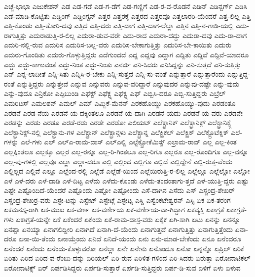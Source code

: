 {ಎಚ್ಜೆ-ಭಾಭಾ
ಎಜುಕೇಶನ್
ಎಡ
ಎಡ-ಗಡೆ
ಎಡ-ಗ-ಡೆಗೆ
ಎಡ-ಗಣ್ಣಿಗೆ
ಎಡ-ರ-ವ-ರೊಡನೆ
ಎಡಿನ್
ಎಡಿನ್ಬರ್ಗ್
ಎಡಿಸಿ
ಎಡೆ-ಮಾಡಿ-ಕೊಟ್ಟಿತು
ಎಡ್ಡಿಂಗ್
ಎಡ್ಡಿಂಗ್ಟನ್
ಎತ್ತರ
ಎತ್ತರಕ್ಕೆ
ಎತ್ತರದ
ಎತ್ತರವೂ
ಎತ್ತಲಾರರಿ-ಯೆಂದರೆ
ಎತ್ತ-ಲಿಲ್ಲ
ಎತ್ತಿ
ಎತ್ತಿ-ಕೊಂಡು
ಎತ್ತಿ-ತೋರಿ-ದವು
ಎತ್ತಿದ
ಎತ್ತಿ-ದರು
ಎತ್ತಿ-ದಾಗ
ಎತ್ತಿ-ದಾಗ-ಲೆಲ್ಲಾ
ಎತ್ತಿನ
ಎತ್ತಿ-ನ-ಗಾಡಿ-ಯಲ್ಲಿ
ಎದು-ರಾಗುತ್ತಿತ್ತು
ಎದುರಾಡುತ್ತಿ-ರ-ಲಿಲ್ಲ
ಎದುರಾ-ಡುವ-ವರೇ
ಎದು-ರಾದ
ಎದುರಾ-ದದ್ದು
ಎದುರಾ-ದವು
ಎದು-ರಾ-ದಾಗ
ಎದುರಿ-ನಲ್ಲಿ-ರುವ
ಎದುರಿಸ
ಎದುರಿಸ-ಬಲ್ಲ-ವರು
ಎದುರಿಸ-ಬೇಕಾಗುತ್ತಿತ್ತು
ಎದುರಿಸ-ಬೇ-ಕಾಯಿತು
ಎದುರು
ಎದುರು-ಗೊಂಡಿತು
ಎದುರು-ಗೊಳ್ಳುತ್ತಿದ್ದರು
ಎದೆಗುಂದದೆ
ಎದ್ದ
ಎದ್ದವು
ಎದ್ದಾಗ
ಎದ್ದಿತು
ಎದ್ದಿವೆ
ಎದ್ದಿವೆ-ಯಾದರೂ
ಎದ್ದು
ಎದ್ದು-ಕಾಣುವಂತೆ
ಎದ್ದು-ನಿಂತ
ಎದ್ದು-ನಿಂತು
ಎನರ್ಜಿ
ಎನಿ-ಸಿದರು
ಎನಿಸಿದ್ದನ್ನು
ಎನಿ-ಸುತ್ತದೆ
ಎನಿ-ಸುತ್ತಿತ್ತು
ಎನ್
ಎನ್ನ-ಲಾದೀತೆ
ಎನ್ನಿ-ಸಿತು
ಎನ್ನಿಸಿ-ರ-ಬೇಕು
ಎನ್ನಿ-ಸುತ್ತದೆ
ಎನ್ನಿ-ಸು-ವಂತೆ
ಎನ್ನುತ್ತಾರೆ
ಎನ್ನುತ್ತಾರೆಂದು
ಎನ್ನುತ್ತಿದ್ದ-ರಂತೆ
ಎನ್ನುತ್ತಿದ್ದರು
ಎನ್ನುತ್ತೇವೆ
ಎನ್ನುವ
ಎನ್ನುವರು
ಎನ್ನುವ-ವರಿದ್ದಾರೆ
ಎನ್ನುವುದರ
ಎನ್ನುವು-ದಷ್ಟೇ
ಎನ್ನು-ವುದು
ಎನ್ನು-ವುದೂ
ಎನ್ರಿಕೋ
ಎಪ್ಪಿಬುಂಡಿ
ಎಫೆಕ್ಟ್
ಎಫೆಕ್ಟ್ನ
ಎಫೆಕ್ಟ್ನ
ಎಫ್
ಎಬ್ಬಿಸಿ-ದರೂ
ಎಬ್ಬಿ-ಸುತ್ತಿದ್ದರು
ಎಬ್ರೆಲ್
ಎಮರಿಟಸ್
ಎಮಲಶನ್
ಎಮಲ್
ಎಮ್
ಎಮ್ಜಿಕೆ-ಮೆನನ್
ಎರಕಹೊಯ್ದು
ಎರಕಹೊಯ್ಯು-ವುದು
ಎರಡಂತೂ
ಎರಡನೆ
ಎರಡ-ನೆಯ
ಎರಡನೆ-ಯ-ದಕ್ಕಿಂತಲೂ
ಎರಡನೆ-ಯ-ದಾಗಿ
ಎರಡನೆ-ಯದು
ಎರಡನೆ-ಯ-ವರು
ಎರಡನೇ
ಎರಡನ್ನು
ಎರಡು
ಎರಡೂ
ಎರಡೆ-ರಡು
ಎರಡೇ
ಎರಡೋ
ಎಲಿಯಟ್
ಎಲೆಕ್ಟ್ರಾನಿಕ್
ಎಲೆಕ್ಟ್ರಾನಿಕ್ಸ್
ಎಲೆಕ್ಟ್ರಾನಿಕ್ಸ್ಗೆ
ಎಲೆಕ್ಟ್ರಾನಿಕ್ಸ್-ನಲ್ಲಿ
ಎಲೆಕ್ಟ್ರಾನು-ಗಳ
ಎಲೆಕ್ಟ್ರಾನ್
ಎಲೆಕ್ಟ್ರಾನ್ಗಳು
ಎಲೆಕ್ಟ್ರಾನ್ನ
ಎಲೆಕ್ಟ್ರಿಕಲ್
ಎಲೆಕ್ಟ್ರಿಕ್
ಎಲೆಕ್ಟ್ರೊಟೆಕ್ನಿಕ್
ಎಲೆ-ಗಳನ್ನು
ಎಲೆ-ಗಳು
ಎಲ್
ಎಲ್ಎ-ರಾಮ-ದಾಸ್
ಎಲ್ಎಲ್ಡಿ
ಎಲ್ಟೆಕ್ಟ್ರೋಕೆಮಿಸ್ಟ್
ಎಲ್ರಾಮ-ರಾವ್
ಎಲ್ಲ
ಎಲ್ಲ-ಕಿಂತ
ಎಲ್ಲಕ್ಕಿಂತಲೂ
ಎಲ್ಲಕ್ಕೂ
ಎಲ್ಲರ
ಎಲ್ಲ-ರನ್ನೂ
ಎಲ್ಲ-ರಿ-ಗಿಂತಲೂ
ಎಲ್ಲ-ರಿಗೂ
ಎಲ್ಲರೂ
ಎಲ್ಲ-ರೊಂದಿಗೂ
ಎಲ್ಲ-ವನ್ನೂ
ಎಲ್ಲ-ವು-ಗಳಲ್ಲಿ
ಎಲ್ಲವೂ
ಎಲ್ಲಾ
ಎಲ್ಲಾ-ದರೂ
ಎಲ್ಲಿ
ಎಲ್ಲಿಂದ
ಎಲ್ಲಿಗೂ
ಎಲ್ಲಿದೆ
ಎಲ್ಲಿದ್ದೇನೆ
ಎಲ್ಲಿ-ರುತ್ತ-ವೆಂದು
ಎಲ್ಲಿಲ್ಲದ
ಎಲ್ಲಿವೆ
ಎಲ್ಲೂ
ಎಲ್ಲೆಂದ-ರಲ್ಲಿ
ಎಲ್ಲೆಡೆ
ಎಲ್ಲೆಡೆ-ಯಿಂದ
ಎಲ್ಲೆಯಿರುತ್ತಿ-ರ-ಲಿಲ್ಲ
ಎಲ್ಲೆಲ್ಲೂ
ಎಲ್ಲೆಲ್ಲೋ
ಎಲ್ಲೋ
ಎಳೆ
ಎಳೆ-ದರು
ಎಳೆ-ದಾಡಿ
ಎಳೆ-ದಿಟ್ಟ
ಎಳೆದು
ಎಳೆದು-ಕೊಂಡು
ಎಳೆದು-ತಂದಂತಾಗು-ತ್ತದೆ
ಎಳೆ-ಯುತ್ತಿ-ದ್ದರು
ಎಷ್ಟು
ಎಷ್ಟೇ
ಎಷ್ಟೊಂದಿದೆ-ಯೆಂದರೆ
ಎಷ್ಟೊಂದು
ಎಷ್ಟೋ
ಎಷ್ಟೋಂದು
ಎಸೆ-ದಾಗಿನ
ಎಸೆದು
ಎಸ್
ಎಸ್ಚಂದ್ರ-ಶೇಖರ್
ಎಸ್ಚಂದ್ರ-ಶೇಖರ್ರ-ವರು
ಎಸ್ಟೇ-ಟನ್ನು
ಎಸ್ಟೇಟ್
ಎಸ್ಟೇಟ್ಗೆ
ಎಸ್ಟೇಟ್ನ
ಎಸ್ಡಿ
ಎಸ್ವೆಂಕಟೇಶ್ವರನ್
ಎಸ್ಸಿ
ಏಕ
ಏಕ-ತರಂಗ
ಏಕಮನಸ್ಕ-ರಾಗಿ
ಏಕ-ಮುಖ
ಏಕ-ವರ್ಣ
ಏಕ-ವರ್ಣೀಯ
ಏಕ-ವರ್ಣೀಯ-ವಾ-ಗಿದ್ದಾಗ
ಏಕವ್ಯಕ್ತಿ
ಏಕಾಗ್ರತೆ
ಏಕಾಗ್ರತೆ-ಗಳು
ಏಕಾಗ್ರತೆ-ಯನ್ನೇ
ಏಕೆ
ಏಕೆಂದರೆ
ಏಕೆಂದು
ಏಕೆ-ರಾಮ-ದಾಸ್ರ-ವರು
ಏಕೈಕ
ಏಗಿ-ಸಾಗಿ
ಏಟು
ಏನನ್ನು
ಏನನ್ನೂ
ಏನಪ್ಪಾ
ಏನಯ್ಯಾ
ಏನಾಗಲಿದ್ದೀರಿ
ಏನಾಗಿದೆ
ಏನಾಗಿ-ದೆ-ಯೆಂದು
ಏನಾಗುತ್ತದೆ
ಏನಾಗುತ್ತಿತ್ತು
ಏನಾಗುತ್ತಿತ್ತೆಂದು
ಏನಾ-ದರೂ
ಏನಾ-ಯಿ-ತೆಂದು
ಏನಾಯ್ತೆಂದು
ಏನಿದೆ
ಏನಿದೆ-ಯಂದು
ಏನು
ಏನು-ಮಾಡ-ಬೇಕೆಂದು
ಏನೂ
ಏನೆಂದರೂ
ಏನೆಂದರೆ
ಏನೆಂದು
ಏನೆಂದು-ಕೊಳ್ಳುವರೋ
ಏನೆಲ್ಲಾ
ಏನೇ
ಏನೇನು
ಏನೊಂದೂ
ಏನೋ
ಏನ್ನನ್ನೊ
ಏಪ್ರಿಲ್
ಏರಿಕೆ
ಏರಿತು
ಏರಿದ
ಏರಿದ-ವ-ರೆಂಬು-ದನ್ನು
ಏರಿಯಲ್
ಏರಿ-ರುವ
ಏರಿಳಿತ-ಗಳಿಂದ
ಏರಿ-ಸಿದರು
ಏರುತ್ತಾ
ಏರೋನಾಟಿಕಲ್
ಏರೋನಾಟಿಕ್ಸ್
ಏರ್
ಏರ್ಪಡಿಸಿದ್ದರು
ಏರ್ಪಡಿ-ಸುತ್ತಾರೆ
ಏರ್ಪಡಿ-ಸುತ್ತಿದ್ದರು
ಏರ್ಪ-ಡಿ-ಸುವ
ಏಳಿಗೆ
ಏಳು
ಏಳುವ
}
